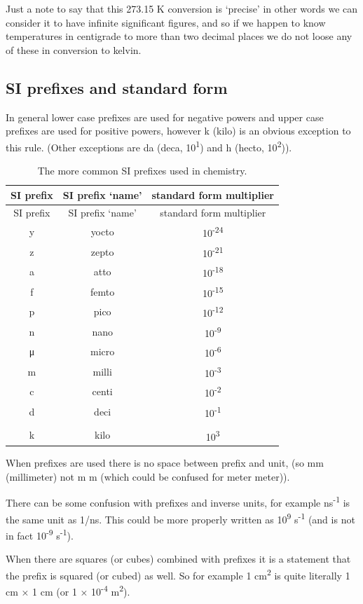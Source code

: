 \documentclass[
]{book}
\begin{document}
Just a note to say that this 273.15 K conversion is `precise' in other words we can consider it to have infinite significant figures, and so if we happen to know temperatures in centigrade to more than two decimal places we do not loose any of these in conversion to kelvin.

\hypertarget{si-prefixes-and-standard-form}{%
\subsection{SI prefixes and standard form}\label{si-prefixes-and-standard-form}}

In general lower case prefixes are used for negative powers and upper case prefixes are used for positive powers, however k (kilo) is an obvious exception to this rule. (Other exceptions are da (deca, 10\textsuperscript{1}) and h (hecto, 10\textsuperscript{2})).

\begin{longtable}[]{@{}ccc@{}}
\caption{\label{tab:SIprefix} The more common SI prefixes used in chemistry.}\tabularnewline
\toprule
SI prefix & SI prefix `name' & standard form multiplier\tabularnewline
\midrule
\endfirsthead
\toprule
SI prefix & SI prefix `name' & standard form multiplier\tabularnewline
\midrule
\endhead
y & yocto & 10\textsuperscript{-24}\tabularnewline
z & zepto & 10\textsuperscript{-21}\tabularnewline
a & atto & 10\textsuperscript{-18}\tabularnewline
f & femto & 10\textsuperscript{-15}\tabularnewline
p & pico & 10\textsuperscript{-12}\tabularnewline
n & nano & 10\textsuperscript{-9}\tabularnewline
μ & micro & 10\textsuperscript{-6}\tabularnewline
m & milli & 10\textsuperscript{-3}\tabularnewline
c & centi & 10\textsuperscript{-2}\tabularnewline
d & deci & 10\textsuperscript{-1}\tabularnewline
& &\tabularnewline
k & kilo & 10\textsuperscript{3}\tabularnewline
\bottomrule
\end{longtable}

When prefixes are used there is no space between prefix and unit, (so mm (millimeter) not m m (which could be confused for meter meter)).

There can be some confusion with prefixes and inverse units, for example ns\textsuperscript{-1} is the same unit as 1/ns. This could be more properly written as 10\textsuperscript{9} s\textsuperscript{-1} (and is not in fact 10\textsuperscript{-9} s\textsuperscript{-1}).

When there are squares (or cubes) combined with prefixes it is a statement that the prefix is squared (or cubed) as well. So for example 1 cm\textsuperscript{2} is quite literally 1 cm × 1 cm (or 1 × 10\textsuperscript{-4} m\textsuperscript{2}).
\end{document}
